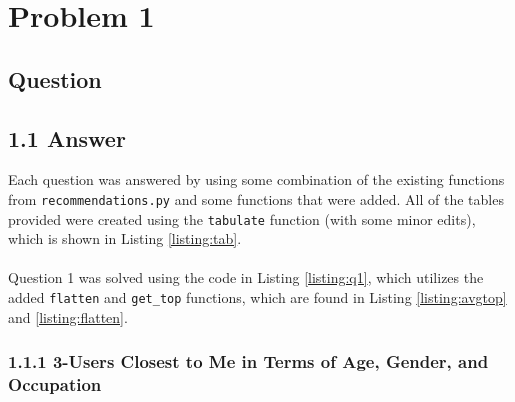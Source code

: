 \section{Problem 1}

\subsection{Question}
\vspace*{10pt}


\subsection{1.1 Answer}

Each question was answered by using some combination of the existing functions from {\tt recommendations.py} and some functions that were added. All of the tables provided were created using the {\tt tabulate} function (with some minor edits), which is shown in Listing \ref{listing:tab}.\\
\\
Question 1 was solved using the code in Listing \ref{listing:q1}, which utilizes the added {\tt flatten} and {\tt get\_top} functions, which are found in Listing \ref{listing:avgtop} and \ref{listing:flatten}.

\clearpage









\clearpage
\subsubsection{1.1.1 3-Users Closest to Me in Terms of Age, Gender, and Occupation}

